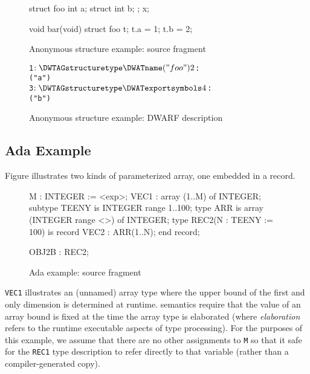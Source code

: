 \begin{figure}[ht]
\begin{nlnlisting}
struct foo {
    int a;
    struct {
        int b;
    };
} x;

void bar(void)
{
    struct foo t;
    t.a = 1;
    t.b = 2;
}

\end{nlnlisting}
\caption{Anonymous structure example: source fragment}
\label{fig:anonymousstructureexamplesourcefragment}
\end{figure}

\begin{figure}[ht]
\begin{dwflisting}
\begin{alltt}
1$:   \DWTAGstructuretype  
          \DWATname("foo")
2$:       \DWTAGmember
              \DWATname("a")
3$:       \DWTAGstructuretype
              \DWATexportsymbols
4$:           \DWTAGmember
                  \DWATname("b")
\end{alltt}
\end{dwflisting}
\caption{Anonymous structure example: DWARF description}
\label{fig:anonymousstructureexampledwarfdescription}
\end{figure}

\subsection{Ada Example}
\label{app:adaexample}
Figure 
illustrates two kinds of  
parameterized array, one embedded in a record.

\begin{figure}[ht]
\begin{nlnlisting}
M : INTEGER := <exp>;
VEC1 : array (1..M) of INTEGER;
subtype TEENY is INTEGER range 1..100;
type ARR is array (INTEGER range <>) of INTEGER;
type REC2(N : TEENY := 100) is record
    VEC2 : ARR(1..N);
end record;

OBJ2B : REC2;
\end{nlnlisting}
\caption{Ada example: source fragment}
\label{fig:adaexamplesourcefragment}
\end{figure}

\texttt{VEC1} illustrates an (unnamed) array type where the upper bound
of the first and only dimension is determined at runtime. 
semantics require that the value of an array bound is fixed at
the time the array type is elaborated (where \textit{elaboration} refers
to the runtime executable aspects of type processing). For
the purposes of this example, we assume that there are no
other assignments to \texttt{M} so that it safe for the \texttt{REC1} type
description to refer directly to that variable (rather than
a compiler-generated copy).

